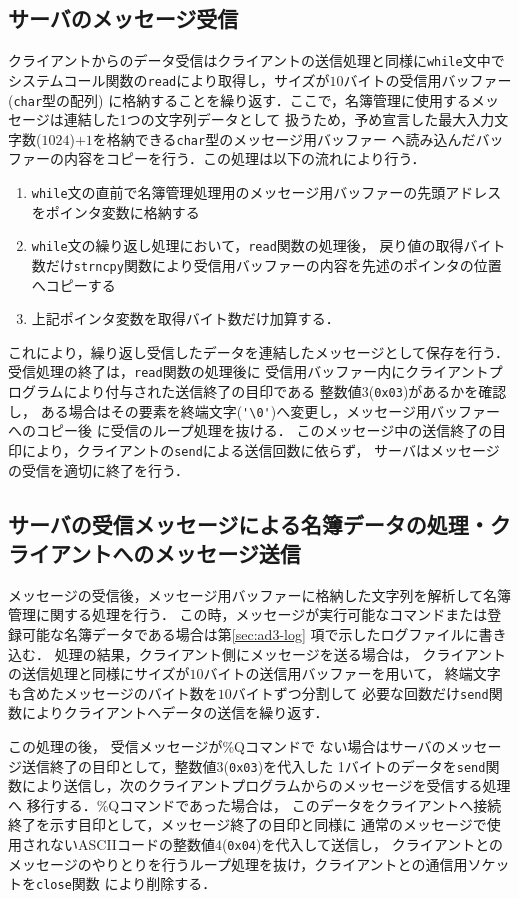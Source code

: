 \subsection{サーバのメッセージ受信}
クライアントからのデータ受信はクライアントの送信処理と同様に\verb|while|文中で
システムコール関数の\verb|read|により取得し，サイズが$10$バイトの受信用バッファー(\verb|char|型の配列)
に格納することを繰り返す．ここで，名簿管理に使用するメッセージは連結した1つの文字列データとして
扱うため，予め宣言した最大入力文字数($1024$)$ + 1$を格納できる\verb|char|型のメッセージ用バッファー
へ読み込んだバッファーの内容をコピーを行う．この処理は以下の流れにより行う．
\begin{enumerate}
  \item \verb|while|文の直前で名簿管理処理用のメッセージ用バッファーの先頭アドレスをポインタ変数に格納する
  \item \verb|while|文の繰り返し処理において，\verb|read|関数の処理後，
  戻り値の取得バイト数だけ\verb|strncpy|関数により受信用バッファーの内容を先述のポインタの位置へコピーする
  \item 上記ポインタ変数を取得バイト数だけ加算する．
\end{enumerate}
これにより，繰り返し受信したデータを連結したメッセージとして保存を行う．
受信処理の終了は，\verb|read|関数の処理後に
受信用バッファー内にクライアントプログラムにより付与された送信終了の目印である
整数値$3$(\verb|0x03|)があるかを確認し，
ある場合はその要素を終端文字(\verb|'\0'|)へ変更し，メッセージ用バッファーへのコピー後
に受信のループ処理を抜ける．
このメッセージ中の送信終了の目印により，クライアントの\verb|send|による送信回数に依らず，
サーバはメッセージの受信を適切に終了を行う．

\subsection{サーバの受信メッセージによる名簿データの処理・クライアントへのメッセージ送信}
メッセージの受信後，メッセージ用バッファーに格納した文字列を解析して名簿管理に関する処理を行う．
この時，メッセージが実行可能なコマンドまたは登録可能な名簿データである場合は第\ref{sec:ad3-log}
項で示したログファイルに書き込む．
処理の結果，クライアント側にメッセージを送る場合は，
クライアントの送信処理と同様にサイズが$10$バイトの送信用バッファーを用いて，
終端文字も含めたメッセージのバイト数を$10$バイトずつ分割して
必要な回数だけ\verb|send|関数によりクライアントへデータの送信を繰り返す．

この処理の後，
受信メッセージが\%Qコマンドで
ない場合はサーバのメッセージ送信終了の目印として，整数値3(\verb|0x03|)を代入した
1バイトのデータを\verb|send|関数により送信し，次のクライアントプログラムからのメッセージを受信する処理へ
移行する．\%Qコマンドであった場合は，
このデータをクライアントへ接続終了を示す目印として，メッセージ終了の目印と同様に
通常のメッセージで使用されないASCIIコードの整数値$4$(\verb|0x04|)を代入して送信し，
クライアントとのメッセージのやりとりを行うループ処理を抜け，クライアントとの通信用ソケットを\verb|close|関数
により削除する．

